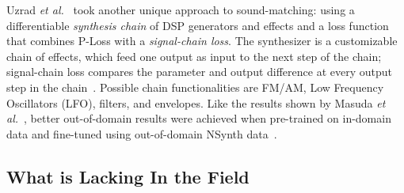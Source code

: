 \documentclass[lettersize,journal]{IEEEtran}
\providecommand{\gls}[1]{#1}
\begin{document}
Uzrad \textit{et al.}~\cite{uzrad2024diffmoog} took another unique approach to sound-matching: using a differentiable \textit{synthesis chain} of DSP generators and effects and a loss function that combines P-Loss with a \textit{signal-chain loss}. The synthesizer is a customizable chain of effects, which feed one output as input to the next step of the chain; signal-chain loss compares the parameter and output difference at every output step in the chain~\cite{uzrad2024diffmoog}. Possible chain functionalities are FM/AM, Low Frequency Oscillators (\gls{LFO}), filters, and envelopes. Like the results shown by Masuda \textit{et al.}~\cite{masuda2021soundmatch}, better out-of-domain results were achieved when pre-trained on in-domain data and fine-tuned using out-of-domain NSynth data~\cite{engel2017neural}. 


\subsection{What is Lacking In the Field}
\label{sec:lacking}
\end{document}
